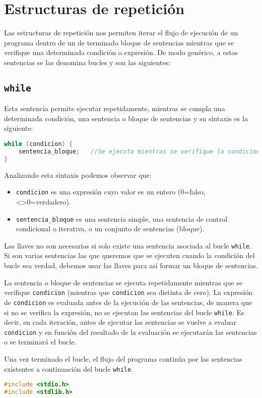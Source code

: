 \section{Estructuras de repetición}
Las estructuras de repetición nos permiten iterar el flujo de ejecución de un programa dentro de un de terminado bloque de sentencias mientras que se verifique una determinada condición o expresión. De modo genérico, a estas sentencias se las denomina bucles y son las siguientes:
\subsection{\texttt{while}}{
Esta sentencia permite ejecutar repetidamente, mientras se cumpla una determinada condición, una sentencia o bloque de sentencias y su sintaxis es la siguiente:
\begin{lstlisting}[language=C]
while (condicion) {
    sentencia_bloque;	//Se ejecuta mientras se verifique la condicion
}
\end{lstlisting}
Analizando esta sintaxis podemos observar que:
\begin{itemize}
	\item \texttt{condicion} es una expresión cuyo valor es un entero (0=falso, <>0=verdadero).
	\item \texttt{sentencia\_bloque} es una sentencia simple, una sentencia de control condicional o iterativa, o un conjunto de sentencias (bloque).
\end{itemize}
Las llaves no son necesarias si solo existe una sentencia asociada al bucle \texttt{while}. Si son varias sentencias las que queremos que se ejecuten cuando la condición del bucle sea verdad, debemos usar las llaves para así formar un bloque de sentencias.

La sentencia o bloque de sentencias se ejecuta repetidamente mientras que se verifique \texttt{condicion} (mientras que \texttt{condicion} sea distinta de cero). La expresión de \texttt{condicion} es evaluada antes de la ejecución de las sentencias, de manera que si no se verifica la expresión, no se ejecutan las sentencias del bucle \texttt{while}. Es decir, en cada iteración, antes de ejecutar las sentencias se vuelve a evaluar \texttt{condicion} y en función del resultado de la evaluación se ejecutarán las sentencias o se terminará el bucle.

Una vez terminado el bucle, el flujo del programa continúa por las sentencias existentes a continuación del bucle \texttt{while}.
\begin{Ejemplo}
\begin{lstlisting}[language=C]
#include <stdio.h>
#include <stdlib.h>


\end{lstlisting}
\end{Ejemplo}}
